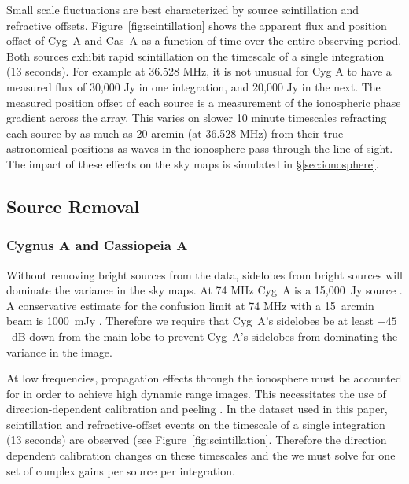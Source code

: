 \documentclass[twocolumn]{aastex61}
\begin{document}
Small scale fluctuations are best characterized by source scintillation and refractive offsets.
Figure~\ref{fig:scintillation} shows the apparent flux and position offset of Cyg~A and Cas~A as a
function of time over the entire observing period. Both sources exhibit rapid scintillation on the
timescale of a single integration (13 seconds). For example at 36.528 MHz, it is not unusual for Cyg
A to have a measured flux of 30,000 Jy in one integration, and 20,000 Jy in the next. The measured
position offset of each source is a measurement of the ionospheric phase gradient across the array.
This varies on slower 10 minute timescales refracting each source by as much as 20 arcmin (at 36.528
MHz) from their true astronomical positions as waves in the ionosphere pass through the line of
sight. The impact of these effects on the sky maps is simulated in \S\ref{sec:ionosphere}.

\subsection{Source Removal}

\subsubsection{Cygnus A and Cassiopeia A}

Without removing bright sources from the data, sidelobes from bright sources will dominate the
variance in the sky maps.  At 74 MHz Cyg~A is a 15,000~Jy source \citep{1977A&A....61...99B}. A
conservative estimate for the confusion limit at 74 MHz with a 15~arcmin beam is 1000~mJy
\citep{2014MNRAS.440..327L}. Therefore we require that Cyg~A's sidelobes be at least $-45$~dB down
from the main lobe to prevent Cyg~A's sidelobes from dominating the variance in the image.

At low frequencies, propagation effects through the ionosphere must be accounted for in order to
achieve high dynamic range images. This necessitates the use of direction-dependent calibration and
peeling \citep{2008ISTSP...2..707M, 2015MNRAS.449.2668S}.  In the dataset used in this paper,
scintillation and refractive-offset events on the timescale of a single integration (13 seconds) are
observed (see Figure~\ref{fig:scintillation}. Therefore the direction dependent calibration changes
on these timescales and the we must solve for one set of complex gains per source per integration.
\end{document}
